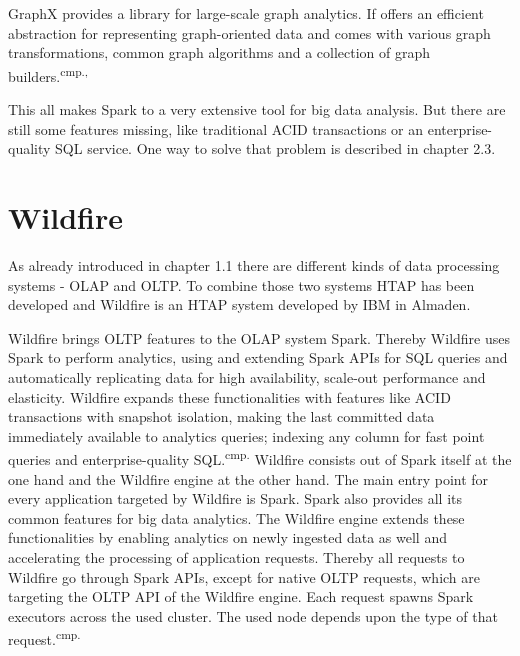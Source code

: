 GraphX provides a library for large-scale graph analytics. If offers an efficient abstraction for representing graph-oriented data and comes with various graph transformations, common graph algorithms and a collection of graph builders.\textsuperscript{cmp.\cite{26}, \cite{28}}

This all makes Spark to a very extensive tool for big data analysis. But there are still some features missing, like traditional ACID transactions or an enterprise-quality SQL service. One way to solve that problem is described in chapter 2.3.



\section{Wildfire}

As already introduced in chapter 1.1 there are different kinds of data processing systems - OLAP and OLTP. To combine those two systems HTAP has been developed and Wildfire is an HTAP system developed by IBM in Almaden.

Wildfire brings OLTP features to the OLAP system Spark. Thereby Wildfire uses Spark to perform analytics, using and extending Spark APIs for SQL queries and automatically replicating data for high availability, scale-out performance and elasticity. Wildfire expands these functionalities with features like ACID transactions with snapshot isolation, making the last committed data immediately available to analytics queries; indexing any column for fast point queries and enterprise-quality SQL.\textsuperscript{cmp.\cite{29}}
Wildfire consists out of Spark itself at the one hand and the Wildfire engine at the other hand. The main entry point for every application targeted by Wildfire is Spark. Spark also provides all its common features for big data analytics. The Wildfire engine extends these functionalities by enabling analytics on newly ingested data as well and accelerating the processing of application requests. Thereby all requests to Wildfire go through Spark APIs, except for native OLTP requests, which are targeting the OLTP API of the Wildfire engine. Each request spawns Spark executors across the used cluster. The used node depends upon the type of that request.\textsuperscript{cmp.\cite{29}}

